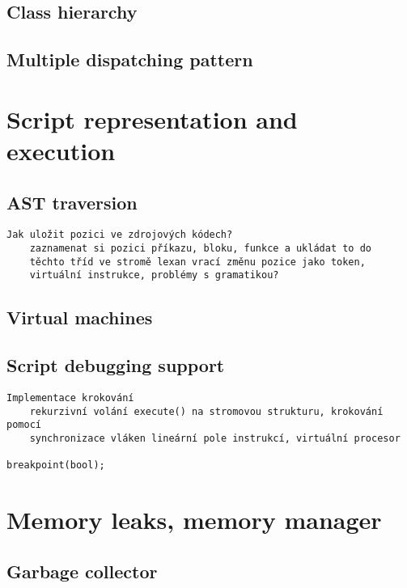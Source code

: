 \documentclass[11pt,twoside,a4paper]{book}
\begin{document}
\subsection{Class hierarchy}

\subsection{Multiple dispatching pattern}


\section{Script representation and execution}


\subsection{AST traversion}

\begin{verbatim}
Jak uložit pozici ve zdrojových kódech?
	zaznamenat si pozici příkazu, bloku, funkce a ukládat to do
	těchto tříd ve stromě lexan vrací změnu pozice jako token,
	virtuální instrukce, problémy s gramatikou?
\end{verbatim}


\subsection{Virtual machines}

\subsection{Script debugging support}

\begin{verbatim}
Implementace krokování
	rekurzivní volání execute() na stromovou strukturu, krokování pomocí
	synchronizace vláken lineární pole instrukcí, virtuální procesor

breakpoint(bool);
\end{verbatim}


\section{Memory leaks, memory manager}

\subsection{Garbage collector}
\end{document}
